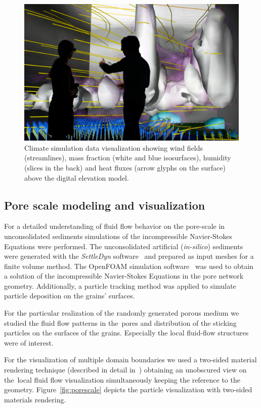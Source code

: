 \documentclass[twocolumn]{svjour3}          %
\begin{document}
\begin{figure}[htb]
  \includegraphics[width=\linewidth]{images/wind.jpg}
  \caption{Climate simulation data visualization showing wind fields (streamlines), mass fraction (white and blue isosurfaces), humidity (slices in the back) and heat fluxes (arrow glyphs on the surface) above the digital elevation model.}
\label{fig:wind}
\end{figure}


\subsection{Pore scale modeling and visualization}
\label{pore-scale}

For a detailed understanding of fluid flow behavior on the pore-scale in unconsolidated sediments simulations of the incompressible Navier-Stokes Equations were performed. The unconsolidated artificial (\emph{in-silico}) sediments were generated with the \emph{SettleDyn} software~\cite{web:SettleDyn} and prepared as input meshes for a finite volume method. The OpenFOAM simulation software~\cite{web:OpenFOAM} was used to obtain a solution of the incompressible Navier-Stokes Equations in the pore network geometry. Additionally, a particle tracking method was applied to simulate particle deposition on the grains' surfaces.

For the particular realization of the randomly generated porous medium we studied the fluid flow patterns in the~pores and distribution of the sticking particles on the surfaces of the grains. Especially the local fluid-flow structures were of interest.

For the visualization of multiple domain boundaries we used a two-sided material rendering technique (described in detail in~\cite{naumov:ees}) obtaining an unobscured view on the~local fluid flow visualization simultaneously keeping the reference to the geometry. Figure~\ref{fig:porescale} depicts the particle visualization with
two-sided materials rendering.
\end{document}
